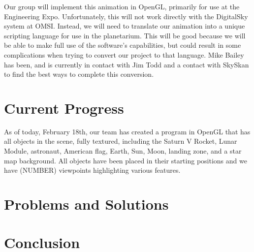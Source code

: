 \documentclass[onecolumn, draftclsnofoot,10pt, compsoc]{IEEEtran}
\begin{document}
Our group will implement this animation in OpenGL, primarily for use at the Engineering Expo. Unfortunately, this will not work directly with the DigitalSky system at OMSI. Instead, we will need to translate our animation into a unique scripting language for use in the planetarium. This will be good because we will be able to make full use of the software's capabilities, but could result in some complications when trying to convert our project to that language. Mike Bailey has been, and is currently in contact with Jim Todd and a contact with SkySkan to find the best ways to complete this conversion.  

\section{Current Progress}
As of today, February 18th, our team has created a program in OpenGL that has all objects in the scene, fully textured, including the Saturn V Rocket, Lunar Module, astronaut, American flag, Earth, Sun, Moon, landing zone, and a star map background. All objects have been placed in their starting positions and we have (NUMBER) viewpoints highlighting various features.





\section{Problems and Solutions}


\section{Conclusion}
\end{document}
